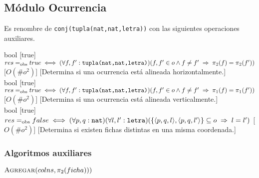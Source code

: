 \subsection{Módulo Ocurrencia}
Es renombre de \texttt{conj(tupla(nat,nat,letra))} con las siguientes operaciones auxiliares.\\
\begin{adjustwidth}{3em}{0em}
\begin{operaciones}
  {
  }{bool}
  [true]
  {$res\igobs true\iff(\forall f,f':\texttt{tupla(nat,nat,letra)})(f,f'\in o\land f\neq f'\implies \pi_{2}(f)=\pi_{2}(f'))$}
  [$O(\#o^{2})$]
  [Determina si una ocurrencia está alineada horizontalmente.]\\

  \noindent{}
  {
  }{bool}
  [true]
  {$res\igobs true\iff(\forall f,f':\texttt{tupla(nat,nat,letra)})(f,f'\in o\land f\neq f'\implies \pi_{1}(f)=\pi_{1}(f'))$}
  [$O(\#o^{2})$]
  [Determina si una ocurrencia está alineada verticalmente.]\\

  \noindent{}
  {
  }{bool}
  [true]
  {$res\igobs false\iff
      (\forall p,q:\texttt{nat})(\forall l,l':\texttt{letra})(
      \{\langle p,q,l\rangle,\langle p,q,l'\rangle\}\subseteq o\implies l=l')$}
  [$O(\#o^{2})$]
  [Determina si existen fichas distintas en una misma coordenada.]
\end{operaciones}
\end{adjustwidth}

\subsubsection{Algoritmos auxiliares}
\begin{algorithm}[H]
  \begin{algorithmic}[1]
    \State{}
      \State{}
      \State$\textsc{Agregar}(colns,\pi_{2}(ficha)))$
    \EndFor
    \State{}
  \end{algorithmic}
\end{algorithm}

